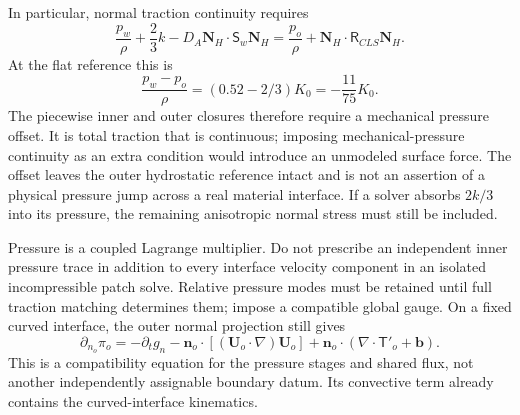 \documentclass[11pt,a4paper]{article}
\numberwithin{equation}{section}
\newcommand{\R}{\mathsf{R}}
\newcommand{\Sm}{\mathsf{S}}
\begin{document}
In particular, normal traction continuity requires
\begin{equation}
 \boxed{\frac{p_w}{\rho}+\frac23k
       -D_A\bm N_H\cdot\Sm_w\bm N_H
 =\frac{p_o}{\rho}+\bm N_H\cdot\R_{CLS}\bm N_H.}
 \label{eq:curve-pressure-jump}
\end{equation}
At the flat reference this is
\begin{equation}
 \frac{p_w-p_o}{\rho}
   =(0.52-2/3)K_0=-\frac{11}{75}K_0.
 \label{eq:curve-reference-pressure-jump}
\end{equation}
The piecewise inner and outer closures therefore require a mechanical
pressure offset. It is total traction that is continuous; imposing
mechanical-pressure continuity as an extra condition would introduce
an unmodeled surface force. The offset leaves the outer hydrostatic
reference intact and is not an assertion of a physical pressure jump
across a real material interface. If a solver absorbs $2k/3$ into its
pressure, the remaining anisotropic normal stress must still be included.

Pressure is a coupled Lagrange multiplier. Do not prescribe an
independent inner pressure trace in addition to every interface
velocity component in an isolated incompressible patch solve.
Relative pressure modes must be retained until full traction matching
determines them; impose a compatible global gauge. On a fixed curved
interface, the outer normal projection still gives
\begin{equation}
 \partial_{n_o}\pi_o=-\partial_t g_n
 -\bm n_o\cdot[(\bm U_o\cdot\nabla)\bm U_o]
 +\bm n_o\cdot(\nabla\cdot\mathsf T'_o+\bm b).
 \label{eq:curve-pressure-step}
\end{equation}
This is a compatibility equation for the pressure stages and shared
flux, not another independently assignable boundary datum. Its
convective term already contains the curved-interface kinematics.
\end{document}
